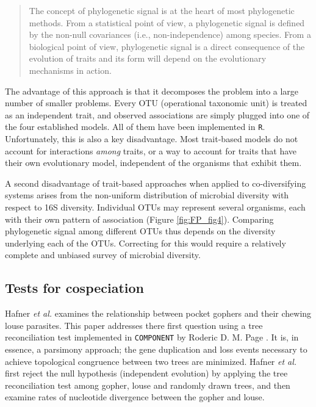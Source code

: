\begin{quote}
The concept of phylogenetic signal is at the heart of most phylogenetic methods. From a statistical point of view, a phylogenetic signal is defined by the non-null covariances (i.e., non-independence) among species. From a biological point of view, phylogenetic signal is a direct consequence of the evolution of traits and its form will depend on the evolutionary mechanisms in action.
\end{quote}

The advantage of this approach is that it decomposes the problem into a large number of smaller problems. Every OTU (operational taxonomic unit) is treated as an independent trait, and observed associations are simply plugged into one of the four established models. All of them have been implemented in {\tt R}. Unfortunately, this is also a key disadvantage. Most trait-based models do not account for interactions {\em among} traits, or a way to account for traits that have their own evolutionary model, independent of the organisms that exhibit them. 

A second disadvantage of trait-based approaches when applied to co-diversifying systems arises from the non-uniform distribution of microbial diversity with respect to 16S diversity. Individual OTUs may represent several organisms, each with their own pattern of association (Figure \ref{fig:FP_fig4}). Comparing phylogenetic signal among different OTUs thus depends on the diversity underlying each of the OTUs. Correcting for this would require a relatively complete and unbiased survey of microbial diversity.



\subsection{Tests for cospeciation}

Hafner {\em et al.} \cite{hafner1994disparate} examines the relationship between pocket gophers and their chewing louse parasites. This paper addresses there first question using a tree reconciliation test implemented in {\tt COMPONENT} by Roderic D. M. Page \cite{page1993genes}. It is, in essence, a parsimony approach; the gene duplication and loss events necessary to achieve topological congruence between two trees are minimized. Hafner {\em et al.} first reject the null hypothesis (independent evolution) by applying the tree reconciliation test among gopher, louse and randomly drawn trees, and then examine rates of nucleotide divergence between the gopher and louse. 

